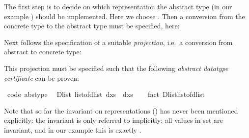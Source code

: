 \begin{isabellebody}
\begin{isamarkuptext}
  The first step is to decide on which representation the abstract
  type (in our example ) should be implemented.
  Here we choose .  Then a conversion from the concrete
  type to the abstract type must be specified, here:%
\end{isamarkuptext}%
\isamarkuptrue%
%
\isadelimquote
%
\endisadelimquote
%
\isatagquote
%
\begin{isamarkuptext}%
%
\end{isamarkuptext}%
\isamarkuptrue%
%
\endisatagquote
{\isafoldquote}%
%
\isadelimquote
%
\endisadelimquote
%
\begin{isamarkuptext}%
\noindent Next follows the specification of a suitable \emph{projection},
  i.e.~a conversion from abstract to concrete type:%
\end{isamarkuptext}%
\isamarkuptrue%
%
\isadelimquote
%
\endisadelimquote
%
\isatagquote
%
\begin{isamarkuptext}%
%
\end{isamarkuptext}%
\isamarkuptrue%
%
\endisatagquote
{\isafoldquote}%
%
\isadelimquote
%
\endisadelimquote
%
\begin{isamarkuptext}%
\noindent This projection must be specified such that the following
  \emph{abstract datatype certificate} can be proven:%
\end{isamarkuptext}%
\isamarkuptrue%
%
\isadelimquote
%
\endisadelimquote
%
\isatagquote
{}\isamarkupfalse%
\ {\isacharbrackleft}code\ abstype{\isacharbrackright}{\isacharcolon}\isanewline
\ \ {\isachardoublequoteopen}Dlist\ {\isacharparenleft}list{\isacharunderscore}of{\isacharunderscore}dlist\ dxs{\isacharparenright}\ {\isacharequal}\ dxs{\isachardoublequoteclose}\isanewline
\ \ \isamarkupfalse%
\ {\isacharparenleft}fact\ Dlist{\isacharunderscore}list{\isacharunderscore}of{\isacharunderscore}dlist{\isacharparenright}%
\endisatagquote
{\isafoldquote}%
%
\isadelimquote
%
\endisadelimquote
%
\begin{isamarkuptext}%
\noindent Note that so far the invariant on representations
  () has never been mentioned explicitly:
  the invariant is only referred to implicitly: all values in
  set  are invariant,
  and in our example this is exactly .
  

\end{isamarkuptext}
\end{isabellebody}
